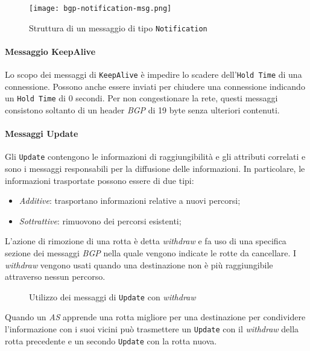 \begin{figure}[h!]
    \centering
    \texttt{[image: bgp-notification-msg.png]}
    \caption{Struttura di un messaggio di tipo \texttt{Notification}}
\end{figure}

\paragraph{Messaggio KeepAlive}
Lo scopo dei messaggi di \texttt{KeepAlive} è impedire lo scadere
dell'\texttt{Hold Time} di una connessione. Possono anche essere inviati per
chiudere una connessione indicando un \texttt{Hold Time} di 0 secondi.
Per non congestionare la rete, questi messaggi consistono soltanto di un
header \emph{BGP} di 19 byte senza ulteriori contenuti.

\paragraph{Messaggi Update}
Gli \texttt{Update} contengono le informazioni di raggiungibilità e gli
attributi correlati e sono i messaggi responsabili per la diffusione delle
informazioni. In particolare, le informazioni trasportate possono essere di due
tipi:
\begin{itemize}
    \item \emph{Additive}: trasportano informazioni relative a nuovi percorsi;
    \item \emph{Sottrattive}: rimuovono dei percorsi esistenti;
\end{itemize}
L'azione di rimozione di una rotta è detta \emph{withdraw} e fa uso di una
specifica sezione dei messaggi \emph{BGP} nella quale vengono indicate le rotte
da cancellare. I \emph{withdraw} vengono usati quando una destinazione non è
più raggiungibile attraverso nessun percorso.

\begin{figure}[h!]
    \centering
    \hfill
    \caption{Utilizzo dei messaggi di \texttt{Update} con \emph{withdraw}}
\end{figure}

\noindent
Quando un \emph{AS} apprende una rotta migliore per una destinazione per
condividere l'informazione con i suoi vicini può trasmettere un \texttt{Update}
con il \emph{withdraw} della rotta precedente e un secondo \texttt{Update} con
la rotta nuova.

